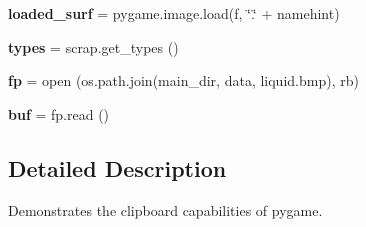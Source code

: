 \begin{DoxyCompactItemize}
\item 
\mbox{\label{namespacepygame_1_1examples_1_1scrap__clipboard_a30df83e92c40b8b3b19dcb8cab427868}} 
{\bfseries loaded\+\_\+surf} = pygame.\+image.\+load(f, \char`\"{}.\char`\"{} + namehint)
\item 
\mbox{\label{namespacepygame_1_1examples_1_1scrap__clipboard_a35b38c41c54b34b3b00cce06c3874723}} 
{\bfseries types} = scrap.\+get\+\_\+types ()
\item 
\mbox{\label{namespacepygame_1_1examples_1_1scrap__clipboard_a380210ab1cdb084e843c65dbf1995012}} 
{\bfseries fp} = open (os.\+path.\+join(main\+\_\+dir, \textquotesingle{}data\textquotesingle{}, \textquotesingle{}liquid.\+bmp\textquotesingle{}), \textquotesingle{}rb\textquotesingle{})
\item 
\mbox{\label{namespacepygame_1_1examples_1_1scrap__clipboard_a7ff41ca07ea13e77df57fc9d93882a9e}} 
{\bfseries buf} = fp.\+read ()
\end{DoxyCompactItemize}


\subsection{Detailed Description}
\begin{DoxyVerb}Demonstrates the clipboard capabilities of pygame.
\end{DoxyVerb}
 